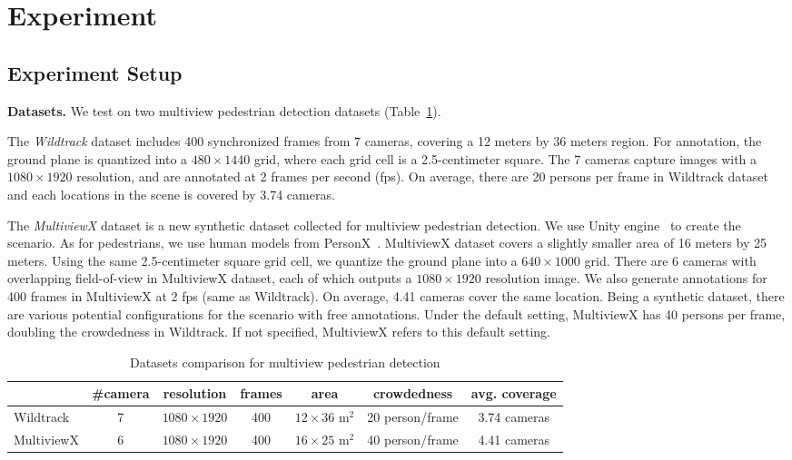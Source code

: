\documentclass[runningheads]{llncs}
\begin{document}
\section{Experiment}
\label{sec:experiment}

\subsection{Experiment Setup}
\label{sec:sec:datasets}

\textbf{Datasets.} We test on two multiview pedestrian detection datasets (Table~\ref{tab:datasets}). 

The \textit{Wildtrack} dataset includes 400 synchronized frames from 7 cameras, covering a 12 meters by 36 meters region. For annotation, the ground plane is quantized into a $480\times 1440$ grid, where each grid cell is a 2.5-centimeter square. The 7 cameras capture images with a $1080\times 1920$ resolution, and are annotated at 2 frames per second (fps). On average, there are 20 persons per frame in Wildtrack dataset and each locations in the scene is covered by 3.74 cameras.

The \textit{MultiviewX} dataset is a new synthetic dataset collected for multiview pedestrian detection. 
We use Unity engine~\cite{unity} to create the scenario. As for pedestrians, we use human models from PersonX~\cite{sun2019dissecting}. MultiviewX dataset covers a slightly smaller area of 16 meters by 25 meters. Using the same 2.5-centimeter square grid cell, we quantize the ground plane into a $640\times 1000$ grid. There are 6 cameras with overlapping field-of-view in MultiviewX dataset, each of which outputs a $1080\times 1920$ resolution image. We also generate annotations for 400 frames in MultiviewX at 2 fps (same as Wildtrack). On average, 4.41 cameras cover the same location. 
Being a synthetic dataset, there are various potential configurations for the scenario with free annotations. 
Under the default setting, MultiviewX has 40 persons per frame, doubling the crowdedness in Wildtrack. 
If not specified, MultiviewX refers to this default setting. 



\begin{table}[t]
\centering
\caption{Datasets comparison for multiview pedestrian detection}
\begin{tabular}{l|c|c|c|c|c|c}
\toprule
\multicolumn{1}{c|}{} & \#camera & resolution & frames & area  & crowdedness & avg. coverage\\ \hline
Wildtrack  & 7                             & $1080\times 1920$                    & 400                         & $12\times 36$ m$^2$                                    & 20 person/frame  & 3.74 cameras                          \\ \hline
MultiviewX & 6                             & $1080\times 1920$                       & 400                         & $16\times 25$ m$^2$                                  & 40 person/frame  & 4.41 cameras                           \\ 
\bottomrule
\end{tabular}
\label{tab:datasets}
\end{table}
\end{document}
